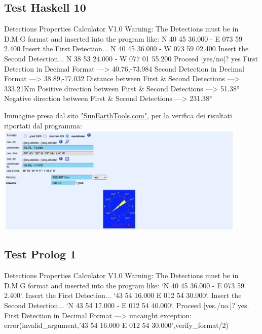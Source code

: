 \documentclass{article}
\begin{document}
\subsection*{Test Haskell 10}
	\begin{spverbatim}
		Detections Properties Calculator V1.0 
		Warning: The Detections must be in D.M.G format and inserted into the program like: N 40 45 36.000 - E 073 59 2.400
		Insert the First Detection...
		N 40 45 36.000 - W 073 59 02.400
		Insert the Second Detection...
		N 38 53 24.000 - W 077 01 55.200
		Proceed [yes/no]?
		yes
		First Detection in Decimal Format ---> 40.76,-73.984
		Second Detection in Decimal Format ---> 38.89,-77.032
		Distance between First & Second Detections ---> 333.21Km
		Positive direction between First & Second Detections ---> 51.38°
		Negative direction between First & Second Detections ---> 231.38°
	\end{spverbatim}
	\bigskip
	Immagine presa dal sito \href{https://www.sunearthtools.com/it/tools/distance.php}{"SunEarthTools.com"}, per la verifica dei risultati riportati dal programma:\\
	\includegraphics[width=0.9\textwidth]{Haskell_Tests/10-Calculation_of_Distant_Coordinates_Check}
	
\newpage
\subsection*{Test Prolog 1}
	\begin{spverbatim}
		Detections Properties Calculator V1.0
		Warning: The Detections must be in D.M.G format and inserted into the program like: `N 40 45 36.000 - E 073 59 2.400`.
		Insert the First Detection...
		`43 54 16.000  E 012 54 30.000`.
		Insert the Second Detection...
		`N 43 54 17.000 - E 012 54 40.000`.
		Proceed [yes./no.]?
		yes.
		First Detection in Decimal Format ---> 
		uncaught exception: error(invalid_argument,'43 54 16.000  E 012 54 30.000',verify_format/2)
	\end{spverbatim}
\end{document}
